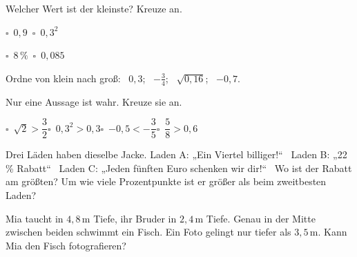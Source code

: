 \documentclass[11pt]{article}
\renewcommand{\kreuz}[1]{\mbox{$\square$\ #1}\quad}
\newcommand{\aufg}[3]{\par\noindent\makebox[0pt][r]{#3}\begin{minipage}[t]{\linewidth}#1\end{minipage}\par}
\newcommand{\nr}[1]{\makebox[7mm][l]{\textbf{#1}}}
\newlength{\kr}
\begin{document}
\medskip
\par\Needspace{25mm}\noindent\colorbox{black!12}{}\hspace{2mm}{\bfseries Alles gemischt: vergleichen und entscheiden}\par\smallskip
\aufg{\nr{E1}Welcher Wert ist der kleinste? Kreuze an.\par\smallskip\leftskip7mm \kreuz{$0{,}9$}\ \kreuz{$0{,}3^2$}\par\kreuz{$8\,\%$}\ \kreuz{$0{,}085$}}{}{}
\medskip
\aufg{\nr{E2}Ordne von klein nach groß: \ $0{,}3$; \ $-\frac{3}{4}$; \ $\sqrt{0{,}16}$; \ $-0{,}7$.}{}{}
\medskip
\aufg{\nr{E3}Nur eine Aussage ist wahr. Kreuze sie an.\par\medskip\noindent\hspace*{7mm}\mbox{$\square$\ $\sqrt{2} > \dfrac{3}{2}$}\hspace{10mm}\mbox{$\square$\ $0{,}3^2 > 0{,}3$}\hspace{10mm}\mbox{$\square$\ $-0{,}5 < -\dfrac{3}{5}$}\hspace{10mm}\mbox{$\square$\ $\dfrac{5}{8} > 0{,}6$}\rule[-3mm]{0pt}{8mm}\par\smallskip }{}{}
\medskip
\aufg{\nr{E4}Drei Läden haben dieselbe Jacke. Laden A: „Ein Viertel billiger!“ \ Laden B: „22\,\% Rabatt“ \ Laden C: „Jeden fünften Euro schenken wir dir!“ \ Wo ist der Rabatt am größten? Um wie viele Prozentpunkte ist er größer als beim zweitbesten Laden?}{}{}
\medskip
\aufg{\nr{E5}Mia taucht in $4{,}8$\,m Tiefe, ihr Bruder in $2{,}4$\,m Tiefe. Genau in der Mitte zwischen beiden schwimmt ein Fisch. Ein Foto gelingt nur tiefer als $3{,}5$\,m. Kann Mia den Fisch fotografieren?}{}{{\scriptsize\color{mbgrau}Ziel\hspace{2mm}}}
\medskip
\end{document}
